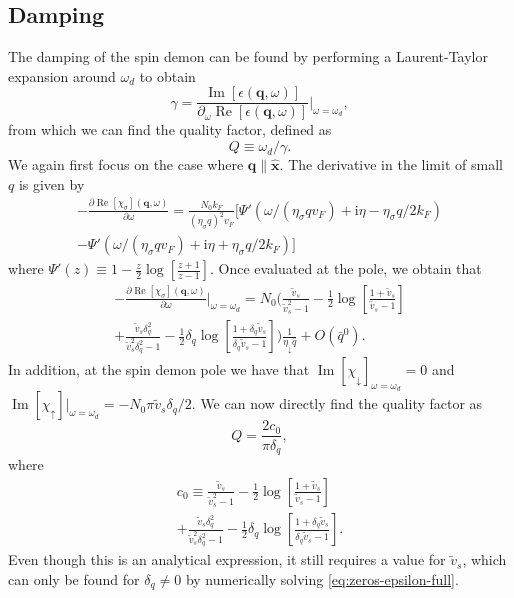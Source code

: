 \documentclass[aps,prb,reprint,twocolumns,superscriptaddress,nofootinbib]{revtex4-2}
\newcommand{\ii}{\mathrm{i}}
\DeclareMathOperator{\Imm}{Im}
\DeclareMathOperator{\Ree}{Re}
\newcommand{\kF}{k_{F}}
\begin{document}
	\subsection{Damping}
	\label{sec:damping}
	The damping of the spin demon can be found by performing a Laurent-Taylor expansion around $\omega_d$ to obtain 
	\begin{equation}
		\gamma = \frac{\Imm[\epsilon(\bm q,\omega)]}{\partial_\omega \Ree[\epsilon(\bm q,\omega)]}\Bigr|_{\omega=\omega_d},
	\end{equation}
	from which we can find the quality factor, defined as 
	\begin{equation}
		Q \equiv \omega_d / \gamma.
	\end{equation}
	We again first focus on the case where $\bm q\parallel\hat{\bm x}$. The derivative in the limit of small $q$ is given by \cite{giulianiQuantumTheoryElectron2005}
	\begin{multline}
		-\frac{\partial\Ree[\chi_\sigma](\bm q,\omega)}{\partial\omega} = \frac{N_0 \kF}{( \eta_\sigma q)^2 v_F} [ \Psi'\left(\omega / (\eta_\sigma q v_F) + \ii \eta - \eta_\sigma q/2\kF \right) 
		\\
		- \Psi'\left(\omega / (\eta_\sigma q v_F) + \ii \eta + \eta_\sigma q/2\kF \right) 
		] 
	\end{multline}
	where $\Psi'(z)\equiv 1- \frac{z}{2}\log\left[\frac{z+1}{z-1}\right]$. 
	Once evaluated at the pole, we obtain that 
	\begin{multline}
		-\frac{\partial\Ree[\chi_\sigma](\bm q,\omega)}{\partial\omega}\Bigr|_{\omega=\omega_d} = 	N_0\Biggl(\frac{\tilde v_s}{\tilde v_s^2 - 1} - \frac{1}{2} \log\left[\frac{1+\tilde v_s}{\tilde v_s-1}\right] \\ 
		+ \frac{\tilde v_s \delta_q^2}{\tilde v_s^2\delta_q^2-1}- \frac{1}{2} \delta_q \log\left[\frac{1+\delta_q\tilde v_s}{\delta_q\tilde v_s-1}\right] \Biggl)\frac{1}{\eta_\downarrow \bar q} +O\left(\bar q^0\right).
	\end{multline}
	In addition, at the spin demon pole we have that $\Imm[\chi_\downarrow]_{\omega=\omega_d}=0$ and $\Imm[\chi_{\uparrow}]|_{\omega=\omega_d}=-N_0\pi \tilde v_s \delta_q/2$. We can now directly find the quality factor as
	\begin{equation}
		Q = \frac{2 c_0}{\pi\delta_q},
	\end{equation}
	where \begin{multline}
		c_0 \equiv \frac{\tilde v_s}{\tilde v_s^2 - 1} - \frac{1}{2} \log\left[\frac{1+\tilde v_s}{\tilde v_s-1} \right] \\
		+ \frac{\tilde v_s \delta_q^2}{\tilde v_s^2\delta_q^2-1}- \frac{1}{2} \delta_q \log\left[\frac{1+\delta_q\tilde v_s}{\delta_q\tilde v_s-1}\right].
	\end{multline}
	Even though this is an analytical expression, it still requires a value for $\tilde v_s$, which can only be found for $\delta_q\neq 0$ by numerically solving \cref{eq:zeros-epsilon-full}.
	
\end{document}
